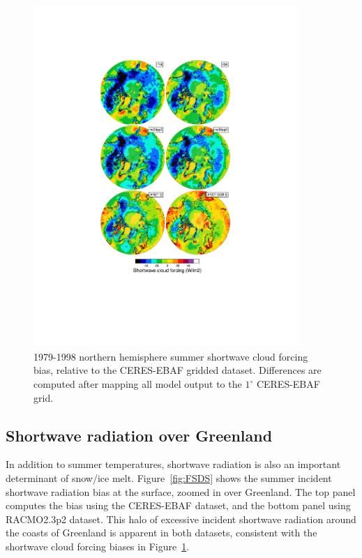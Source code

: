 \documentclass[draft]{agujournal2019}
\begin{document}
\begin{figure}[t]
\begin{center}
         \includegraphics[width=100mm]{figs/temp_contours_diffCERES_SWCF.pdf}
\end{center}
\caption{1979-1998 northern hemisphere summer shortwave cloud forcing bias, relative to the CERES-EBAF gridded dataset. Differences are computed after mapping all model output to the $1^{\circ}$ CERES-EBAF grid.}
\label{fig:SWCF}
\end{figure}

\subsection{Shortwave radiation over Greenland}

In addition to summer temperatures, shortwave radiation is also an important determinant of snow/ice melt. Figure~\ref{fig:FSDS} shows the summer incident shortwave radiation bias at the surface, zoomed in over Greenland. The top panel computes the bias using the CERES-EBAF dataset, and the bottom panel using RACMO2.3p2 dataset.
This halo of excessive incident shortwave radiation around the coasts of Greenland is apparent in both datasets, consistent with the shortwave cloud forcing biases in Figure~\ref{fig:SWCF}.
\end{document}
